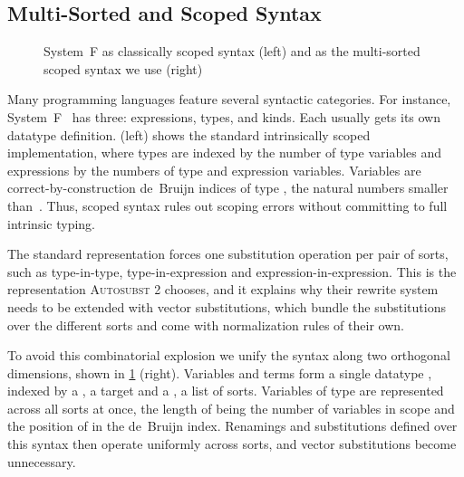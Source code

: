 \documentclass[sigplan,anonymous,review]{acmart}
\theoremstyle{acmdefinition}
\begin{document}
\subsection{Multi-Sorted and Scoped Syntax}\label{sec:pre-syn}
\begin{figure}[t]
  \AgdaNoSpaceAroundCode{}
  \setlength{\mathindent}{0pt}
  \begin{minipage}[t]{0.44\linewidth}
    \raggedright{}
    \EScoped{}
  \end{minipage}
  \hfill
  \begin{minipage}[t]{0.52\linewidth}
    \raggedright{}
    \EMultiSorted{}
    \EMultiSortedTm{}
  \end{minipage}
  \caption{System~F as classically scoped syntax (left) and as the multi-sorted
    scoped syntax we use (right)}\label{fig:pre-svm}
\end{figure}

Many programming languages feature several syntactic categories. For instance,
System~F~\cite{girard1972, 10.1007/3-540-06859-7_148} has three: expressions,
types, and kinds. Each usually gets its own datatype definition.
 (left) shows the standard intrinsically scoped
implementation, where types are indexed by the number of type variables and
expressions by the numbers of type and expression variables. Variables are
correct-by-construction de~Bruijn indices of type 
, the natural numbers smaller than~. Thus, scoped
syntax rules out scoping errors without committing to full intrinsic typing.

The standard representation forces one substitution operation per pair of
sorts, such as type-in-type, type-in-expression and expression-in-expression.
This is the representation \textsc{Autosubst 2} chooses, and it explains why
their rewrite system needs to be extended with vector substitutions, which
bundle the substitutions over the different sorts and come with normalization
rules of their own.

To avoid this combinatorial explosion we unify the syntax along two orthogonal
dimensions, shown in \cref{fig:pre-svm} (right). Variables and terms form a
single datatype  \AgdaDatatype{⊢[}  \AgdaDatatype{]}
, indexed by a  , a target
  and a  , a
list of sorts. Variables of type   
are represented across all sorts at once, the length of  being the
number of variables in scope and the position of  in 
the de~Bruijn index. Renamings and substitutions defined over this syntax then
operate uniformly across sorts, and vector substitutions become unnecessary.
\end{document}
